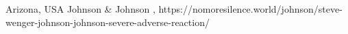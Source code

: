           {Arizona, USA}
          {}
          {Johnson \& Johnson}
          {}
          {
            ,
          }
          {https://nomoresilence.world/johnson/steve-wenger-johnson-johnson-severe-adverse-reaction/}
          

